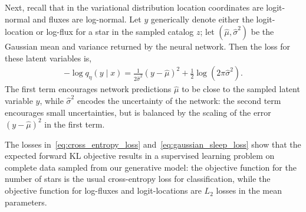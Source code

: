 Next, recall that in the variational distribution location coordinates are logit-normal and fluxes are log-normal.
Let $y$ generically denote either the logit-location or log-flux for a star in the sampled catalog $z$; let $(\hat\mu, \hat\sigma^2)$ be the Gaussian mean and variance returned by the neural network. Then the loss for these latent variables is,
\begin{align}
    -\log q_\eta(y \mid x) =
        \frac{1}{2\hat\sigma^2}(y - \hat\mu)^2
         + \frac{1}{2}\log(2\pi\hat\sigma^2).
         \label{eq:gaussian_sleep_loss}
\end{align}
The first term encourages network predictions $\hat\mu$ to be close to the sampled latent variable $y$, while $\hat\sigma^2$ encodes the uncertainty of the network: the second term encourages small uncertainties, but is
balanced by the scaling of the error $(y - \hat\mu)^2$ in the first term.



The losses in~\eqref{eq:cross_entropy_loss} and~\eqref{eq:gaussian_sleep_loss} show that the
expected forward KL objective results in a supervised learning problem on complete data
sampled from our generative model:
the objective function for the number of stars is the usual cross-entropy loss for classification,
while the objective function for log-fluxes and logit-locations are $L_2$ losses in the mean parameters.



